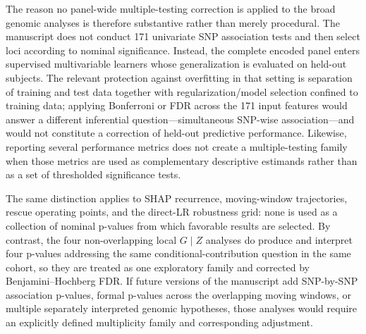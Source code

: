 The reason no panel-wide multiple-testing correction is applied to the broad genomic analyses is therefore substantive rather than merely procedural. The manuscript does not conduct 171 univariate SNP association tests and then select loci according to nominal significance. Instead, the complete encoded panel enters supervised multivariable learners whose generalization is evaluated on held-out subjects. The relevant protection against overfitting in that setting is separation of training and test data together with regularization/model selection confined to training data; applying Bonferroni or FDR across the 171 input features would answer a different inferential question---simultaneous SNP-wise association---and would not constitute a correction of held-out predictive performance. Likewise, reporting several performance metrics does not create a multiple-testing family when those metrics are used as complementary descriptive estimands rather than as a set of thresholded significance tests.

The same distinction applies to SHAP recurrence, moving-window trajectories, rescue operating points, and the direct-LR robustness grid: none is used as a collection of nominal p-values from which favorable results are selected. By contrast, the four non-overlapping local $G\mid Z$ analyses do produce and interpret four p-values addressing the same conditional-contribution question in the same cohort, so they are treated as one exploratory family and corrected by Benjamini--Hochberg FDR. If future versions of the manuscript add SNP-by-SNP association p-values, formal p-values across the overlapping moving windows, or multiple separately interpreted genomic hypotheses, those analyses would require an explicitly defined multiplicity family and corresponding adjustment.
